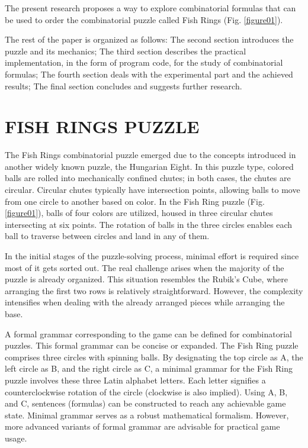 \documentclass[a4paper,twocolumn,10pt]{article}
\begin{document}
The present research proposes a way to explore combinatorial formulas that can be used to order the combinatorial puzzle called Fish Rings (Fig. \ref{figure01})\cite{Balabanov2015}.

The rest of the paper is organized as follows: The second section introduces the puzzle and its mechanics; The third section describes the practical implementation, in the form of program code, for the study of combinatorial formulas; The fourth section deals with the experimental part and the achieved results; The final section concludes and suggests further research.

\section{FISH RINGS PUZZLE}

The Fish Rings combinatorial puzzle emerged due to the concepts introduced in another widely known puzzle, the Hungarian Eight. In this puzzle type, colored balls are rolled into mechanically confined chutes; in both cases, the chutes are circular. Circular chutes typically have intersection points, allowing balls to move from one circle to another based on color. In the Fish Ring puzzle (Fig. \ref{figure01}), balls of four colors are utilized, housed in three circular chutes intersecting at six points. The rotation of balls in the three circles enables each ball to traverse between circles and land in any of them.

In the initial stages of the puzzle-solving process, minimal effort is required since most of it gets sorted out. The real challenge arises when the majority of the puzzle is already organized. This situation resembles the Rubik's Cube, where arranging the first two rows is relatively straightforward. However, the complexity intensifies when dealing with the already arranged pieces while arranging the base.

A formal grammar corresponding to the game can be defined for combinatorial puzzles. This formal grammar can be concise or expanded. The Fish Ring puzzle comprises three circles with spinning balls. By designating the top circle as A, the left circle as B, and the right circle as C, a minimal grammar for the Fish Ring puzzle involves these three Latin alphabet letters. Each letter signifies a counterclockwise rotation of the circle (clockwise is also implied). Using A, B, and C, sentences (formulas) can be constructed to reach any achievable game state. Minimal grammar serves as a robust mathematical formalism. However, more advanced variants of formal grammar are advisable for practical game usage.
\end{document}
